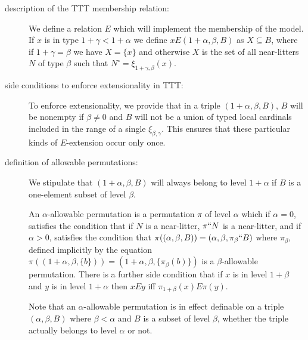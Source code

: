 \documentclass[12pt]{article}
\begin{document}
\begin{description}
\item[description of the TTT membership relation:]

We define a relation $E$ which will implement the membership of the model.   If $x$ is in type $1+\gamma<1+\alpha$ we define
$x E (1+\alpha,\beta,B)$ as $X \subseteq B$, where if $1+\gamma=\beta$ we have $X = \{x\}$ and otherwise $X$ is the set of all near-litters $N$ of type $\beta$ such that
$N^{\circ}=\xi_{1+\gamma,\beta}(x)$.

\item[side conditions to enforce extensionality in TTT:]

To enforce extensionality, we provide that in a triple $(1+\alpha,\beta,B)$, $B$ will be nonempty if $\beta \neq 0$ and $B$ will not be a union of typed local cardinals included in the range of a single $\xi_{\beta,\gamma}$.  This ensures that these particular kinds of $E$-extension occur only once.

\item[definition of allowable permutations:]

We stipulate that $(1+\alpha,\beta,B)$ will always belong to level $1+\alpha$ if $B$ is a one-element subset of level $\beta$.

An $\alpha$-allowable permutation is a permutation $\pi$ of level $\alpha$ which if $\alpha=0$, satisfies the condition that if $N$ is a near-litter, $\pi``N$ is a near-litter,
and if $\alpha>0$, satisfies the condition that $\pi((\alpha,\beta,B)) = (\alpha,\beta,\pi_{\beta}``B)$ where $\pi_{\beta}$, defined implicitly by the equation $\pi((1+\alpha,\beta,\{b\})) =(1+\alpha,\beta,\{\pi_{\beta}(b)\})$ is a $\beta$-allowable permutation.  There is a further side condition that if $x$ is in level $1+\beta$ and $y$ is in level $1+\alpha$ then $x E y$ iff
$\pi_{1+\beta}(x) E \pi(y)$.

Note that an  $\alpha$-allowable permutation is in effect definable on a triple $(\alpha,\beta,B)$ where $\beta<\alpha$ and $B$ is a subset of level $\beta$, whether the triple actually belongs to level $\alpha$ or not.


\end{description}
\end{document}

